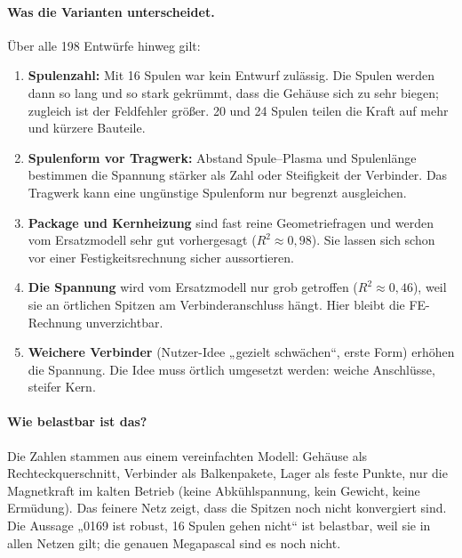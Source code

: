 \paragraph{Was die Varianten unterscheidet.} Über alle 198 Entwürfe hinweg gilt:
\begin{enumerate}
\item \textbf{Spulenzahl:} Mit 16 Spulen war kein Entwurf zulässig. Die Spulen werden dann so lang und so stark
  gekrümmt, dass die Gehäuse sich zu sehr biegen; zugleich ist der Feldfehler größer. 20 und 24 Spulen teilen die
  Kraft auf mehr und kürzere Bauteile.
\item \textbf{Spulenform vor Tragwerk:} Abstand Spule--Plasma und Spulenlänge bestimmen die Spannung stärker als
  Zahl oder Steifigkeit der Verbinder. Das Tragwerk kann eine ungünstige Spulenform nur begrenzt ausgleichen.
\item \textbf{Package und Kernheizung} sind fast reine Geometriefragen und werden vom Ersatzmodell sehr gut
  vorhergesagt ($R^2 \approx 0{,}98$). Sie lassen sich schon vor einer Festigkeitsrechnung sicher aussortieren.
\item \textbf{Die Spannung} wird vom Ersatzmodell nur grob getroffen ($R^2 \approx 0{,}46$), weil sie an örtlichen
  Spitzen am Verbinderanschluss hängt. Hier bleibt die FE-Rechnung unverzichtbar.
\item \textbf{Weichere Verbinder} (Nutzer-Idee „gezielt schwächen“, erste Form) erhöhen die Spannung. Die Idee muss
  örtlich umgesetzt werden: weiche Anschlüsse, steifer Kern.
\end{enumerate}

\paragraph{Wie belastbar ist das?} Die Zahlen stammen aus einem vereinfachten Modell: Gehäuse als
Rechteckquerschnitt, Verbinder als Balkenpakete, Lager als feste Punkte, nur die Magnetkraft im kalten Betrieb
(keine Abkühlspannung, kein Gewicht, keine Ermüdung). Das feinere Netz zeigt, dass die Spitzen noch nicht
konvergiert sind. Die Aussage „0169 ist robust, 16 Spulen gehen nicht“ ist belastbar, weil sie in allen Netzen
gilt; die genauen Megapascal sind es noch nicht.

